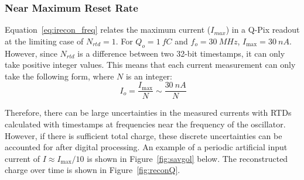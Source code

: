 \subsubsection{Near Maximum Reset Rate}
Equation~\ref{eq:irecon_freq} relates the maximum current ($I_{max}$) in a Q-Pix readout at the limiting case of $N_{rtd} = 1$.
For $Q_{o} = 1~\unit{fC}$ and $f_{o} = 30~\unit{MHz}$, $I_{\mathrm{max}} = 30~\unit{nA}$.
However, since $N_{rtd}$ is a difference between two 32-bit timestamps, it can only take positive integer values.
This means that each current measurement can only take the following form, where $N$ is an integer: 
\begin{equation}~\label{eq:i_max}
I_{o} = \frac{I_{\mathrm{max}}}{N} \sim \frac{30~\unit{nA}}{N}
\end{equation}

Therefore, there can be large uncertainties in the measured currents with RTDs calculated with timestamps at frequencies near the frequency of the oscillator.
However, if there is sufficient total charge, these discrete uncertainties can be accounted for after digital processing.
An example of a periodic artificial input current of $I \approx I_{\mathrm{max}}/10$ is shown in Figure~\ref{fig:savgol} below.
The reconstructed charge over time is shown in Figure~\ref{fig:reconQ}.

